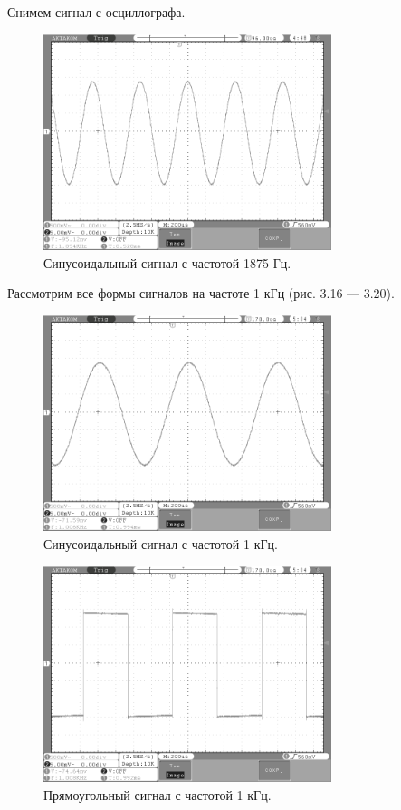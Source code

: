 	Снимем сигнал с осциллографа.
	\begin{figure}[H]
    \centering
    \includegraphics[width=0.75\textwidth]{../image/1875.bmp}
    \caption{Синусоидальный сигнал с частотой 1875 Гц.}
	\end{figure}	
	
	Рассмотрим все формы сигналов на частоте 1 кГц (рис. 3.16 --- 3.20).

	\begin{figure}[H]
    \centering
    \includegraphics[width=0.75\textwidth]{../image/sin1.bmp}
    \caption{Синусоидальный сигнал с частотой 1 кГц.}
	\end{figure}	
	
	\begin{figure}[H]
    \centering
    \includegraphics[width=0.75\textwidth]{../image/square1.bmp}
    \caption{Прямоугольный сигнал с частотой 1 кГц.}
	\end{figure}	
	
